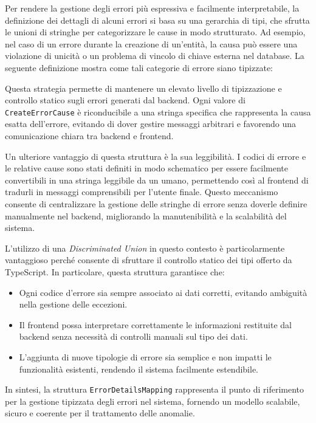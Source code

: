Per rendere la gestione degli errori più espressiva e facilmente interpretabile, la definizione dei dettagli di alcuni errori si basa su una gerarchia di tipi, che sfrutta le unioni di stringhe per categorizzare le cause in modo strutturato. Ad esempio, nel caso di un errore durante la creazione di un'entità, la causa può essere una violazione di unicità o un problema di vincolo di chiave esterna nel database. La seguente definizione mostra come tali categorie di errore siano tipizzate:



Questa strategia permette di mantenere un elevato livello di tipizzazione e controllo statico sugli errori generati dal backend. Ogni valore di \texttt{CreateErrorCause} è riconducibile a una stringa specifica che rappresenta la causa esatta dell'errore, evitando di dover gestire messaggi arbitrari e favorendo una comunicazione chiara tra backend e frontend.

Un ulteriore vantaggio di questa struttura è la sua leggibilità. I codici di errore e le relative cause sono stati definiti in modo schematico per essere facilmente convertibili in una stringa leggibile da un umano, permettendo così al frontend di tradurli in messaggi comprensibili per l'utente finale. Questo meccanismo consente di centralizzare la gestione delle stringhe di errore senza doverle definire manualmente nel backend, migliorando la manutenibilità e la scalabilità del sistema.

L'utilizzo di una \textit{Discriminated Union} in questo contesto è particolarmente vantaggioso perché consente di sfruttare il controllo statico dei tipi offerto da TypeScript. In particolare, questa struttura garantisce che:
\begin{itemize}
  \item Ogni codice d’errore sia sempre associato ai dati corretti, evitando ambiguità nella gestione delle eccezioni.
  \item Il frontend possa interpretare correttamente le informazioni restituite dal backend senza necessità di controlli manuali sul tipo dei dati.
  \item L’aggiunta di nuove tipologie di errore sia semplice e non impatti le funzionalità esistenti, rendendo il sistema facilmente estendibile.
\end{itemize}

In sintesi, la struttura \texttt{ErrorDetailsMapping} rappresenta il punto di riferimento per la gestione tipizzata degli errori nel sistema, fornendo un modello scalabile, sicuro e coerente per il trattamento delle anomalie.

